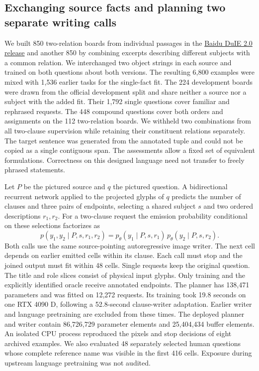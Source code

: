 \subsection*{Exchanging source facts and planning two separate writing calls}
We built 850 two-relation boards from individual passages in the \href{https://github.com/PaddlePaddle/PaddleNLP/issues/447}{Baidu DuIE 2.0 release} and another 850 by combining excerpts describing different subjects with a common relation. We interchanged two object strings in each source and trained on both questions about both versions. The resulting 6,800 examples were mixed with 1,536 earlier tasks for the single-fact fit. The 224 development boards were drawn from the official development split and share neither a source nor a subject with the added fit. Their 1,792 single questions cover familiar and rephrased requests. The 448 compound questions cover both orders and assignments on the 112 two-relation boards. We withheld two combinations from all two-clause supervision while retaining their constituent relations separately. The target sentence was generated from the annotated tuple and could not be copied as a single contiguous span. The assessments allow a fixed set of equivalent formulations. Correctness on this designed language need not transfer to freely phrased statements.

Let $P$ be the pictured source and $q$ the pictured question. A bidirectional recurrent network applied to the projected glyphs of $q$ predicts the number of clauses and three pairs of endpoints, selecting a shared subject $s$ and two ordered descriptions $r_1,r_2$. For a two-clause request the emission probability conditional on these selections factorizes as
\[
  p(y_1,y_2\mid P,s,r_1,r_2)=
    p_\theta(y_1\mid P,s,r_1)\,p_\theta(y_2\mid P,s,r_2).
\]
Both calls use the same source-pointing autoregressive image writer. The next cell depends on earlier emitted cells within its clause. Each call must stop and the joined output must fit within 48 cells. Single requests keep the original question. The title and role slices consist of physical input glyphs. Only training and the explicitly identified oracle receive annotated endpoints. The planner has 138,471 parameters and was fitted on 12,272 requests. Its training took 19.8 seconds on one RTX 4090 D, following a 52.8-second clause-writer adaptation. Earlier writer and language pretraining are excluded from these times. The deployed planner and writer contain 86,726,729 parameter elements and 25,404,434 buffer elements. An isolated CPU process reproduced the pixels and stop decisions of eight archived examples. We also evaluated 48 separately selected human questions whose complete reference name was visible in the first 416 cells. Exposure during upstream language pretraining was not audited.

